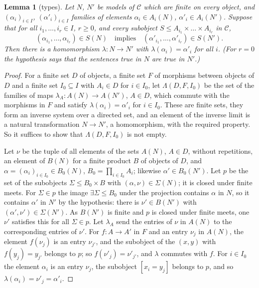 \documentclass[11pt]{amsart}
\newtheorem{lem}[thm]{Lemma}
\theoremstyle{definition}
\newcommand{\cC}{\mathcal C}
\begin{document}
\begin{lem}[types]\label{lem:types}
Let $N$, $N'$ be models of $\cC$ which are finite on every object, and
$(\alpha_i)_{i\in I}$, $(\alpha'_i)_{i\in I}$ families of elements
$\alpha_i\in A_i(N)$, $\alpha'_i\in A_i(N')$. Suppose that for all
$i_1,\dots,i_r\in I$, $r\ge0$, and every subobject $S\le A_{i_1}\times\dots\times
A_{i_r}$ in $\cC$,
\[
(\alpha_{i_1},\dots,\alpha_{i_r})\in S(N)\quad\text{implies}\quad
(\alpha'_{i_1},\dots,\alpha'_{i_r})\in S(N').
\]
Then there is a homomorphism $\lambda\colon N\to N'$ with
$\lambda(\alpha_i)=\alpha'_i$ for all $i$. (For $r=0$ the hypothesis
says that the sentences true in $N$ are true in $N'$.)
\end{lem}
\begin{proof}
For a finite set $D$ of objects, a finite set $F$ of morphisms between
objects of $D$ and a finite set $I_0\subseteq I$ with $A_i\in D$ for
$i\in I_0$, let $\Lambda(D,F,I_0)$ be the set of the families of maps
$\lambda_A\colon A(N)\to A(N')$, $A\in D$, which commute with the
morphisms in $F$ and satisfy $\lambda(\alpha_i)=\alpha'_i$ for $i\in
I_0$. These are finite sets, they form an inverse system over a
directed set, and an element of the inverse limit is a natural
transformation $N\to N'$, a homomorphism, with the required property.
So it suffices to show that $\Lambda(D,F,I_0)$ is not empty.

Let $\nu$ be the tuple of all elements of the sets $A(N)$, $A\in D$,
without repetitions, an element of $B(N)$ for a finite product $B$ of
objects of $D$, and $\alpha=(\alpha_i)_{i\in I_0}\in B_0(N)$, $B_0=
\prod_{i\in I_0}A_i$; likewise $\alpha'\in B_0(N')$. Let $p$ be the set
of the subobjects $\Sigma\le B_0\times B$ with $(\alpha,\nu)\in\Sigma
(N)$; it is closed under finite meets. For $\Sigma\in p$ the image
$\exists\Sigma\le B_0$ under the projection contains $\alpha$ in $N$,
so it contains $\alpha'$ in $N'$ by the hypothesis: there is $\nu'\in
B(N')$ with $(\alpha',\nu')\in\Sigma(N')$. As $B(N')$ is finite and $p$
is closed under finite meets, one $\nu'$ satisfies this for all
$\Sigma\in p$. Let $\lambda_A$ send the entries of $\nu$ in $A(N)$ to
the corresponding entries of $\nu'$. For $f\colon A\to A'$ in $F$ and
an entry $\nu_j$ in $A(N)$, the element $f(\nu_j)$ is an entry
$\nu_{j'}$, and the subobject of the $(x,y)$ with $f(y_j)=y_{j'}$
belongs to $p$; so $f(\nu'_j)=\nu'_{j'}$, and $\lambda$ commutes with
$f$. For $i\in I_0$ the element $\alpha_i$ is an entry $\nu_j$, the
subobject $[x_i=y_j]$ belongs to $p$, and so $\lambda(\alpha_i)=\nu'_j
=\alpha'_i$.
\end{proof}
\end{document}
